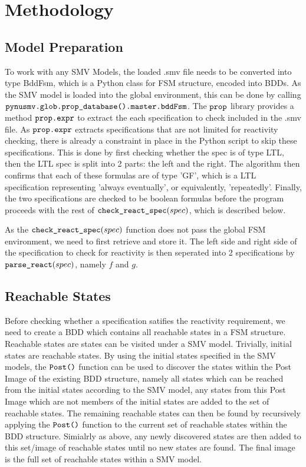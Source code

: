 \section{Methodology}

\subsection{Model Preparation}

To work with any SMV Models, the loaded .smv file needs to be converted into type BddFsm, which is a Python class for FSM structure, encoded into BDDs. As the SMV model is loaded into the global environment, this can be done by calling $\verb|pynusmv.glob.prop_database().master.bddFsm|$. The $\verb|prop|$ library provides a method $\verb|prop.expr|$ to extract the each specification to check included in the .smv file. As $\verb|prop.expr|$ extracts specifications that are not limited for reactivity checking, there is already a constraint in place in the Python script to skip these specifications. This is done by first checking whether the spec is of type LTL, then the LTL spec is split into 2 parts: the left and the right. The algorithm then confirms that each of these formulas are of type 'GF', which is a LTL specification representing 'always eventually', or equivalently, 'repeatedly'. Finally, the two specifications are checked to be boolean formulas before the program proceeds with the rest of $\verb|check_react_spec|(spec)$, which is described below.

\medskip

As the $\verb|check_react_spec|(spec)$ function does not pass the global FSM environment, we need to first retrieve and store it. The left side and right side of the specification to check for reactivity is then seperated into 2 specifications by $\verb|parse_react|(spec)$, namely $f$ and $g$.

\subsection{Reachable States}

Before checking whether a specification satifies the reactivity requirement, we need to create a BDD which contains all reachable states in a FSM structure. Reachable states are states can be visited under a SMV model. Trivially, initial states are reachable states. By using the initial states specified in the SMV models, the $\verb|Post()|$ function can be used to discover the states within the Post Image of the existing BDD structure, namely all states which can be reached from the initial states according to the SMV model, any states from this Post Image which are not members of the initial states are added to the set of reachable states. The remaining reachable states can then be found by recursively applying the $\verb|Post()|$ function to the current set of reachable states within the BDD structure. Simialrly as above, any newly discovered states are then added to this set/image of reachable states until no new states are found. The final image is the full set of reachable states within a SMV model.

